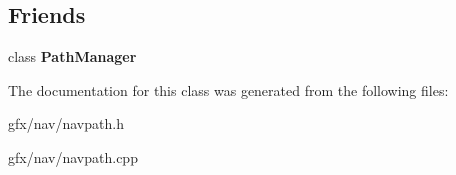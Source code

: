 \subsection*{Friends}
\begin{DoxyCompactItemize}
\item 
class {\bfseries Path\+Manager}\hypertarget{classNavPath_a2142fc9a622affd7844e372a514326f6}{}\label{classNavPath_a2142fc9a622affd7844e372a514326f6}

\end{DoxyCompactItemize}


The documentation for this class was generated from the following files\+:\begin{DoxyCompactItemize}
\item 
gfx/nav/navpath.\+h\item 
gfx/nav/navpath.\+cpp\end{DoxyCompactItemize}
